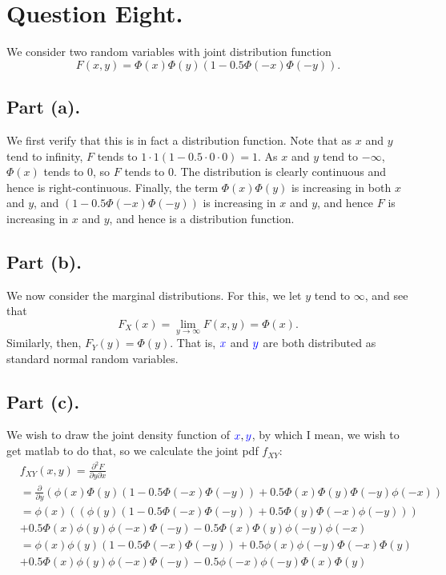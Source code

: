 \documentclass{article}
\renewcommand{\r}[1]{\textcolor{blue}{#1}}
\begin{document}
\section{Question Eight.}
We consider two random variables with joint distribution function
\begin{equation} F(x,y)=\Phi(x)\Phi(y)(1-0.5\Phi(-x)\Phi(-y)).\end{equation}

\subsection{Part (a).}
We first verify that this is in fact a distribution function. Note that as $x$ and $y$ tend to infinity, $F$ tends to $1\cdot1(1-0.5\cdot0\cdot0)=1$. As $x$ and $y$ tend to $-\infty$, $\Phi(x)$ tends to 0, so $F$ tends to 0. The distribution is clearly continuous and hence is right-continuous. Finally, the term $\Phi(x)\Phi(y)$ is increasing in both $x$ and $y$, and $(1-0.5\Phi(-x)\Phi(-y))$ is increasing in $x$ and $y$, and hence $F$ is increasing in $x$ and $y$, and hence is a distribution function.

\subsection{Part (b).}
We now consider the marginal distributions. For this, we let $y$ tend to $\infty$, and see that
\begin{equation} F_{X}(x)=\lim_{y\to\infty}F(x,y)=\Phi(x).\end{equation}
Similarly, then, $F_{Y}(y)=\Phi(y)$. That is, $\r{x}$ and $\r{y}$ are both distributed as standard normal random variables.

\subsection{Part (c).}
We wish to draw the joint density function of $\r{x},\r{y}$, by which I mean, we wish to get matlab to do that, so we calculate the joint pdf $f_{XY}$:
\begin{equation}\begin{split}
&f_{XY}(x,y) = \frac{\partial^{2}F}{\partial y \partial x}\\
&= \frac{\partial}{\partial y}\left(\phi(x)\Phi(y)(1-0.5\Phi(-x)\Phi(-y))+0.5\Phi(x)\Phi(y)\Phi(-y)\phi(-x)\right)\\
&=\phi(x)((\phi(y)(1-0.5\Phi(-x)\Phi(-y))+0.5\Phi(y)\Phi(-x)\phi(-y)))\\&+0.5\Phi(x)\phi(y)\phi(-x)\Phi(-y)-0.5\Phi(x)\Phi(y)\phi(-y)\phi(-x)\\
&= \phi(x)\phi(y)(1-0.5\Phi(-x)\Phi(-y))+0.5\phi(x)\phi(-y)\Phi(-x)\Phi(y)\\&+0.5\Phi(x)\phi(y)\phi(-x)\Phi(-y)-0.5\phi(-x)\phi(-y)\Phi(x)\Phi(y)
\end{split}\end{equation}
\end{document}
